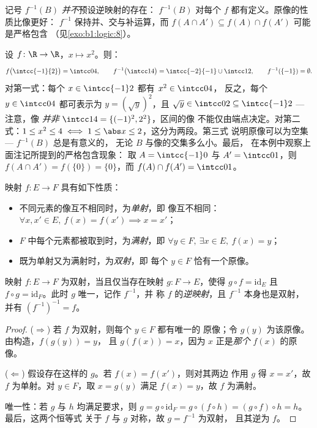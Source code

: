 \begin{remark}
记号 $f^{-1}(B)$ \emph{并不}预设逆映射的存在：
$f^{-1}(B)$ 对每个 $f$ 都有定义。原像的性质比像更好：
$f^{-1}$ 保持并、交与补运算，而
$f(A \cap A') \subseteq f(A) \cap f(A')$ 可能是严格包含
（见\cref{exo:b1:logic:8}）。
\end{remark}

\begin{example}[计算像与原像]\label{ex:b1:logic:images}
设 $f \colon \R \to \R$，$x \mapsto x^2$。则：
\[
f\bigl(\intcc{-1}{2}\bigr) = \intcc04, \qquad
f^{-1}\bigl(\intcc14\bigr) = \intcc{-2}{-1} \cup \intcc12, \qquad
f^{-1}(\{-1\}) = \emptyset .
\]
对第一式：每个 $x \in \intcc{-1}2$ 都有 $x^2 \in \intcc04$，
反之，每个 $y \in \intcc04$ 都可表示为 $y = (\sqrt y)^2$，且 $\sqrt y
\in \intcc02 \subseteq \intcc{-1}2$ --- 注意，像
\emph{并非} $\intcc14 = \{(-1)^2, 2^2\}$，区间的像
不能仅由端点决定。对第二式：$1 \leq x^2 \leq 4 \iff
1 \leq \abs x \leq 2$，这分为两段。第三式
说明原像可以为空集 --- $f^{-1}(B)$ 总是有意义的，
无论 $B$ 与像的交集多么小。最后，
在本例中观察上面注记所提到的严格包含现象：
取 $A = \intcc{-1}0$ 与 $A' = \intcc01$，则 $f(A \cap A') =
f(\{0\}) = \{0\}$，而 $f(A) \cap f(A') = \intcc01$。
\end{example}

\begin{definition}[单射、满射、双射]\label{def:b1:logic:inj}
映射 $f \colon E \to F$ 具有如下性质：
\begin{itemize}
  \item 不同元素的像互不相同时，为\emph{单射}，即
        像互不相同： $\forall x, x' \in E,\ f(x) = f(x') \implies
        x = x'$；
  \item $F$ 中每个元素都被取到时，为\emph{满射}，即
        $\forall y \in F,\ \exists x \in E,\ f(x) = y$；
  \item 既为单射又为满射时，为\emph{双射}，即
        每个 $y \in F$ 恰有一个原像。
\end{itemize}
\end{definition}

\begin{theorem}[逆映射]\label{thm:b1:logic:inverse}
映射 $f \colon E \to F$ 为双射，当且仅当存在映射
$g \colon F \to E$，使得 $g \circ f = \mathrm{id}_E$ 且 $f \circ g =
\mathrm{id}_F$。此时 $g$ 唯一，记作 $f^{-1}$，并
称 $f$ 的\emph{逆映射}，且 $f^{-1}$ 本身也是双射，
并有 $(f^{-1})^{-1} = f$。
\end{theorem}

\begin{proof}
($\Rightarrow$) 若 $f$ 为双射，则每个 $y \in F$ 都有唯一的
原像；令 $g(y)$ 为该原像。由构造，$f(g(y)) = y$，
且 $g(f(x)) = x$，因为 $x$ 正是\emph{那个}
$f(x)$ 的原像。

($\Leftarrow$) 假设存在这样的 $g$。若 $f(x) = f(x')$，则对其两边
作用 $g$ 得 $x = x'$，故 $f$ 为单射。对 $y \in F$，取 $x = g(y)$
满足 $f(x) = y$，故 $f$ 为满射。

唯一性：若 $g$ 与 $h$ 均满足要求，则 $g = g \circ \mathrm{id}_F
= g \circ (f \circ h) = (g \circ f) \circ h = h$。最后，这两个恒等式
关于 $f$ 与 $g$ 对称，故 $g = f^{-1}$ 为双射，
且其逆为 $f$。
\end{proof}

